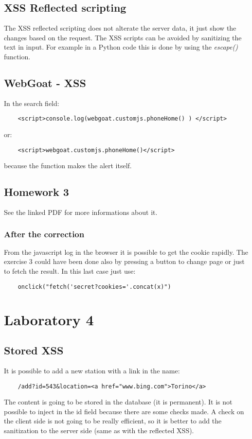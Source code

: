 \documentclass[a4paper, 10pt, titlepage]{article}
\begin{document}
\subsection{XSS Reflected scripting}
The XSS reflected scripting does not alterate the server data, it just show the changes based on the request.
The XSS scripts can be avoided by sanitizing the text in input. For example in a Python code this is done by using the \textit{escape()} function.
\subsection{WebGoat - XSS}
In the search field:
\begin{lstlisting}
	<script>console.log(webgoat.customjs.phoneHome() ) </script>
\end{lstlisting}
or:
\begin{lstlisting}
	<script>webgoat.customjs.phoneHome()</script>
\end{lstlisting}
because the function makes the alert itself.
\subsection{Homework 3}
	See the linked PDF for more informations about it. 
\subsubsection{After the correction}
From the javascript log in the browser it is possible to get the cookie rapidly. The exercise 3 could have been done also by pressing a button to change page or just to fetch the result. In this last case just use:
\begin{lstlisting}
	onclick("fetch('secret?cookies='.concat(x)")
\end{lstlisting}

\section{Laboratory 4}
\subsection{Stored XSS}
It is possible to add a new station with a link in the name:
\begin{lstlisting}
	/add?id=543&location=<a href="www.bing.com">Torino</a>
\end{lstlisting}
The content is going to be stored in the database (it is permanent).
It is not possible to inject in the id field because there are some checks made. A check on the client side is not going to be really efficient, so it is better to add the sanitization to the server side (same as with the reflected XSS).
\end{document}
